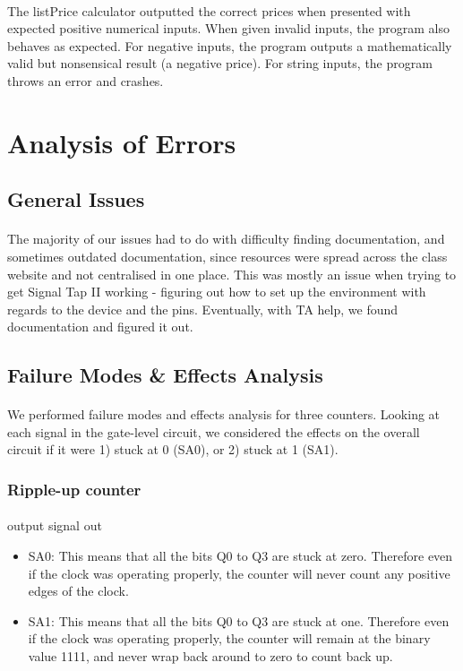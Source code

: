 \documentclass{article}
\begin{document}
  \paragraph{} The listPrice calculator outputted the correct prices when presented with expected positive numerical inputs. When given invalid inputs, the program also behaves as expected. For negative inputs, the program outputs a mathematically valid but nonsensical result (a negative price). For string inputs, the program throws an error and crashes.



\section{Analysis of Errors}
  \subsection{General Issues}
  \paragraph{} The majority of our issues had to do with difficulty finding documentation, and sometimes outdated documentation, since resources were spread across the class website and not centralised in one place. This was mostly an issue when trying to get Signal Tap II working - figuring out how to set up the environment with regards to the device and the pins. Eventually, with TA help, we found documentation and figured it out.

  \subsection{Failure Modes \& Effects Analysis}
  \paragraph{}We performed failure modes and effects analysis for three counters. Looking at each signal in the gate-level circuit, we considered the effects on the overall circuit if it were 1) stuck at 0 (SA0), or 2) stuck at 1 (SA1).

  \subsubsection{Ripple-up counter}
	\paragraph{} output signal out
	\begin{itemize}
		\item SA0: This means that all the bits Q0 to Q3 are stuck at zero. Therefore even if the clock was operating properly, the counter will never count any positive edges of the clock.
		\item SA1: This means that all the bits Q0 to Q3 are stuck at one. Therefore even if the clock was operating properly, the counter will remain at the binary value 1111, and never wrap back around to zero to count back up. 
	\end{itemize}
\end{document}
